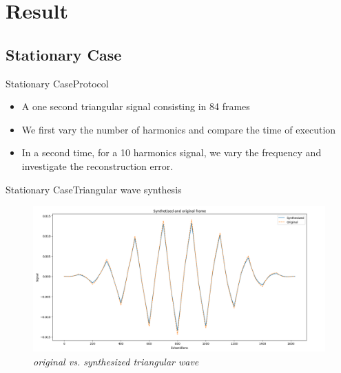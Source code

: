 \documentclass{bredelebeamer}
\begin{document}
\section{Result}
\subsection{Stationary Case}
\begin{frame}{Stationary Case}{Protocol}
\begin{itemize}
\item A one second triangular signal consisting in 84 frames
\item We first vary the number of harmonics and compare the time of execution
\item In a second time, for a 10 harmonics signal, we vary the frequency and investigate the reconstruction error.
\end{itemize}
\end{frame}
\begin{frame}{Stationary Case}{Triangular wave synthesis}
\begin{figure}
      \includegraphics[scale=0.15]{triangle.png}
      \caption{\it original vs. synthesized triangular wave}
\end{figure}
\end{frame}
\end{document}
